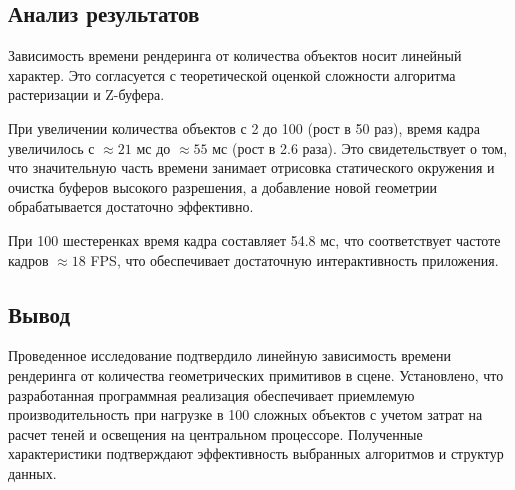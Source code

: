 \subsection{Анализ результатов}

Зависимость времени рендеринга от количества объектов носит линейный характер. Это согласуется с теоретической оценкой сложности алгоритма растеризации и Z-буфера.

При увеличении количества объектов с 2 до 100 (рост в 50 раз), время кадра увеличилось с $\approx 21$ мс до $\approx 55$ мс (рост в 2.6 раза). Это свидетельствует о том, что значительную часть времени занимает отрисовка статического окружения и очистка буферов высокого разрешения, а добавление новой геометрии обрабатывается достаточно эффективно.

При 100 шестеренках время кадра составляет 54.8 мс, что соответствует частоте кадров $\approx 18$ FPS, что обеспечивает достаточную интерактивность приложения.

\subsection*{Вывод}

Проведенное исследование подтвердило линейную зависимость времени рендеринга от количества геометрических примитивов в сцене. Установлено, что разработанная программная реализация обеспечивает приемлемую производительность при нагрузке в 100 сложных объектов с учетом затрат на расчет теней и освещения на центральном процессоре. Полученные характеристики подтверждают эффективность выбранных алгоритмов и структур данных.
